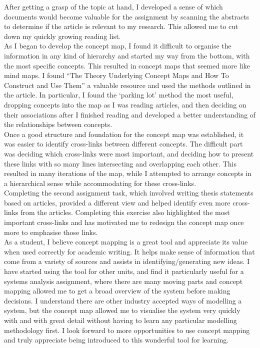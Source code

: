 \documentclass[12pt,a4paper]{report}
\begin{document}
After getting a grasp of the topic at hand, I developed a sense of which documents would become valuable for the assignment by scanning the abstracts to determine if the article is relevant to my research. This allowed me to cut down my quickly growing reading list.\\

As I began to develop the concept map, I found it difficult to organise the information in any kind of hierarchy and started my way from the bottom, with the most specific concepts. This resulted in concept maps that seemed more like mind maps. I found \citet{Novak2006} ``The Theory Underlying Concept Maps and How To Construct and Use Them'' a valuable resource and used the methods outlined in the article. In particular, I found the `parking lot' method the most useful, dropping concepts into the map as I was reading articles, and then deciding on their associations after I finished reading and developed a better understanding of the relationships between concepts.\\

Once a good structure and foundation for the concept map was established, it was easier to identify cross-links between different concepts. The difficult part was deciding which cross-links were most important, and deciding how to present these links with so many lines intersecting and overlapping each other. This resulted in many iterations of the map, while I attempted to arrange concepts in a hierarchical sense while accommodating for these cross-links.\\

Completing the second assignment task, which involved writing thesis statements based on articles, provided a different view and helped identify even more cross-links from the articles. Completing this exercise also highlighted the most important cross-links and has motivated me to redesign the concept map once more to emphasise those links.\\

As a student, I believe concept mapping is a great tool and appreciate its value when used correctly for academic writing. It helps make sense of information that come from a variety of sources and assists in identifying/generating new ideas. I have started using the tool for other units, and find it particularly useful for a systems analysis assignment, where there are many moving parts and concept mapping allowed me to get a broad overview of the system before making decisions. I understand there are other industry accepted ways of modelling a system, but the concept map allowed me to visualise the system very quickly with and with great detail without having to learn any particular modelling methodology first. I look forward to more opportunities to use concept mapping and truly appreciate being introduced to this wonderful tool for learning.



\end{document}
